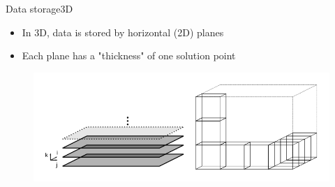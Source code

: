 \documentclass{beamer}
\begin{document}
\begin{frame}{Data storage}{3D}
\begin{itemize}
    \item In 3D, data is stored by horizontal (2D) planes
    \item Each plane has a "thickness" of one solution point
\end{itemize}
\begin{figure}
    \includegraphics[scale=1.1]{img/3d_storage}
\end{figure}
\end{frame}
\end{document}
